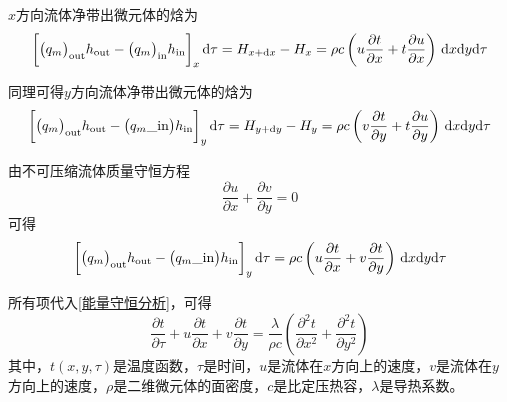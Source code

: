 $x$方向流体净带出微元体的焓为
\begin{equation}
	\bigg[\big( q_m \big)_{\text{out}} h_{\text{out}} -\big(q_m \big)_{\text{in}} h_{\text{in}} \bigg]_{x} \, {\rm{d}} \tau = H_{x + {\rm{d}} x} - H_x = \rho c \left(u \dfrac{\partial t}{\partial x} + t \dfrac{\partial u}{\partial x}\right)\, {\rm{d}} x {\rm{d}} y {\rm{d}} \tau
\end{equation}

同理可得$y$方向流体净带出微元体的焓为
\begin{equation}
	\bigg[\big( q_m \big)_{\text{out}} h_{\text{out}} -\big(q_m\_{\text{in}} \big) h_{\text{in}} \bigg]_{y} \, {\rm{d}} \tau = H_{y + {\rm{d}} y} - H_y = \rho c \left(v \dfrac{\partial t}{\partial y} + t \dfrac{\partial u}{\partial y}\right)\, {\rm{d}} x {\rm{d}} y {\rm{d}} \tau
\end{equation}

由不可压缩流体质量守恒方程
\begin{equation}
	\dfrac{\partial u}{\partial x} + \dfrac{\partial v}{\partial y} = 0
\end{equation}
可得
\begin{equation}
		\bigg[\big( q_m \big)_{\text{out}} h_{\text{out}} -\big(q_m\_{\text{in}} \big) h_{\text{in}} \bigg]_{y} \, {\rm{d}} \tau = \rho c \left(u \dfrac{\partial t}{\partial x} + v \dfrac{\partial t}{\partial y}\right)\, {\rm{d}} x {\rm{d}} y {\rm{d}} \tau
\end{equation}

所有项代入\eqref{能量守恒分析}，可得
\begin{equation}
	\dfrac{\partial t}{\partial \tau} + u \dfrac{\partial t}{\partial x} + v \dfrac{\partial t}{\partial y} = \dfrac{\lambda}{\rho c}\left(\dfrac{\partial^2 t}{\partial x^2} + \dfrac{\partial^2 t}{\partial y^2}\right)
	\label{运动流体}
\end{equation}
其中，$t(x,y,\tau)$是温度函数，$\tau$是时间，$u$是流体在$x$方向上的速度，$v$是流体在$y$方向上的速度，$\rho$是二维微元体的面密度，$c$是比定压热容，$\lambda $是导热系数。
\clearpage

